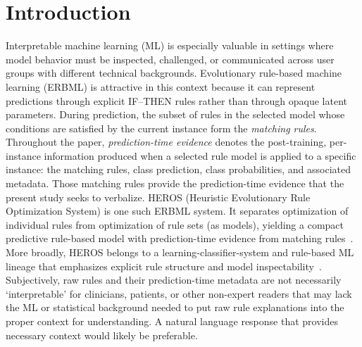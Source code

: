 \documentclass[sigconf]{acmart}
\begin{document}

\maketitle

\section{Introduction}
Interpretable machine learning (ML) is especially valuable in settings where model behavior must be inspected, challenged, or communicated across user groups with different technical backgrounds. Evolutionary rule-based machine learning (ERBML) is attractive in this context because it can represent predictions through explicit IF--THEN rules rather than through opaque latent parameters. During prediction, the subset of rules in the selected model whose conditions are satisfied by the current instance form the \emph{matching rules}. Throughout the paper, \emph{prediction-time evidence} denotes the post-training, per-instance information produced when a selected rule model is applied to a specific instance: the matching rules, class prediction, class probabilities, and associated metadata. Those matching rules provide the prediction-time evidence that the present study seeks to verbalize. HEROS (Heuristic Evolutionary Rule Optimization System) is one such ERBML system. It separates optimization of individual rules from optimization of rule sets (as models), yielding a compact predictive rule-based model with prediction-time evidence from matching rules~\cite{lipschutzvilla2025heros}. More broadly, HEROS belongs to a learning-classifier-system and rule-based ML lineage that emphasizes explicit rule structure and model inspectability~\cite{urbanowicz2009lcs,urbanowicz2017intro,urbanowicz2015exstracs}. Subjectively, raw rules and their prediction-time metadata are not necessarily `interpretable' for clinicians, patients, or other non-expert readers that may lack the ML or statistical background needed to put raw rule explanations into the proper context for understanding. A natural language response that provides necessary context would likely be preferable. %
\end{document}
